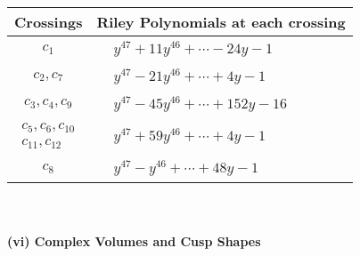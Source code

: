 \documentclass[1p]{elsarticle_modified}
\theoremstyle{definition}
\begin{document}
\begin{tabular}{m{50pt}|m{274pt}}
Crossings & \hspace{64pt}Riley Polynomials at each crossing \\
\hline $$\begin{aligned}c_{1}\end{aligned}$$&$\begin{aligned}
&y^{47}+11 y^{46}+\cdots-24 y-1
\end{aligned}$\\
\hline $$\begin{aligned}c_{2},c_{7}\end{aligned}$$&$\begin{aligned}
&y^{47}-21 y^{46}+\cdots+4 y-1
\end{aligned}$\\
\hline $$\begin{aligned}c_{3},c_{4},c_{9}\end{aligned}$$&$\begin{aligned}
&y^{47}-45 y^{46}+\cdots+152 y-16
\end{aligned}$\\
\hline $$\begin{aligned}c_{5},c_{6},c_{10}\\c_{11},c_{12}\end{aligned}$$&$\begin{aligned}
&y^{47}+59 y^{46}+\cdots+4 y-1
\end{aligned}$\\
\hline $$\begin{aligned}c_{8}\end{aligned}$$&$\begin{aligned}
&y^{47}- y^{46}+\cdots+48 y-1
\end{aligned}$\\
\hline
\end{tabular}\\~\\
\newpage\flushleft \textbf{(vi) Complex Volumes and Cusp Shapes}
\end{document}
